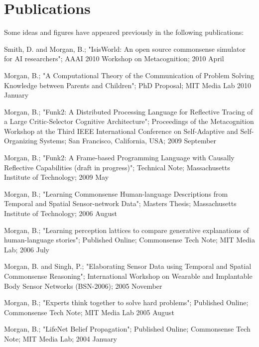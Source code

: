 \chapter*{Publications}
Some ideas and figures have appeared previously in the following publications:

\bigskip

\noindent Smith, D. and Morgan, B.; "IsisWorld: An open source
 commonsense simulator for AI researchers"; AAAI 2010 Workshop on
 Metacognition; 2010 April

\vspace{5mm}

\noindent Morgan, B.; "A Computational Theory of the Communication of
 Problem Solving Knowledge between Parents and Children"; PhD
 Proposal; MIT Media Lab 2010 January

\vspace{5mm}

\noindent Morgan, B.; "Funk2: A Distributed Processing Language for 
 Reflective Tracing of a Large Critic-Selector Cognitive
 Architecture"; Proceedings of the Metacognition Workshop at the Third
 IEEE International Conference on Self-Adaptive and Self-Organizing
 Systems; San Francisco, California, USA; 2009 September

\vspace{5mm}

\noindent Morgan, B.; "Funk2: A Frame-based Programming Language with
 Causally Reflective Capabilities (draft in progress)"; Technical
 Note; Massachusetts Institute of Technology; 2009 May

\vspace{5mm}

\noindent Morgan, B.; "Learning Commonsense Human-language Descriptions
 from Temporal and Spatial Sensor-network Data"; Masters Thesis;
 Massachusetts Institute of Technology; 2006 August

\vspace{5mm}

\noindent Morgan, B.; "Learning perception lattices to compare
 generative explanations of human-language stories"; Published Online;
 Commonsense Tech Note; MIT Media Lab; 2006 July

\vspace{5mm}

\noindent Morgan, B. and Singh, P.; "Elaborating Sensor Data using
 Temporal and Spatial Commonsense Reasoning"; International Workshop
 on Wearable and Implantable Body Sensor Networks (BSN-2006); 2005
 November

\vspace{5mm}

\noindent Morgan, B.; "Experts think together to solve hard problems";
 Published Online; Commonsense Tech Note; MIT Media Lab 2005 August

\vspace{5mm}

\noindent Morgan, B.; "LifeNet Belief Propagation"; Published Online;
 Commonsense Tech Note; MIT Media Lab; 2004 January
